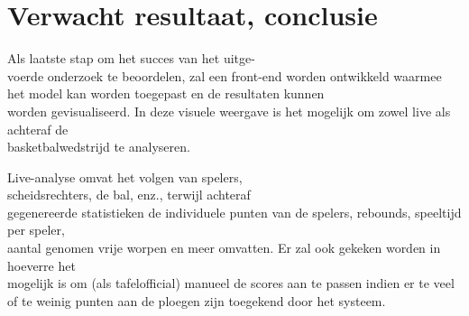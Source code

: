 \section{Verwacht resultaat, conclusie}%
\label{sec:verwachte_resultaten}







Als laatste stap om het succes van het uitge-\\voerde onderzoek te beoordelen, zal een front-end worden ontwikkeld waarmee het model kan worden toegepast en de resultaten kunnen \\worden gevisualiseerd. 
In deze visuele weergave is het mogelijk om zowel live als achteraf de \\basketbalwedstrijd te analyseren.


Live-analyse omvat het volgen van spelers, \\scheidsrechters, de bal, enz., terwijl achteraf \\gegenereerde statistieken de individuele punten van de spelers, rebounds, speeltijd per speler, \\aantal genomen vrije worpen en meer omvatten. Er zal ook gekeken worden in hoeverre het \\mogelijk is om (als tafelofficial) manueel de scores aan te passen indien er te veel of te weinig punten aan de ploegen zijn toegekend door het systeem.


